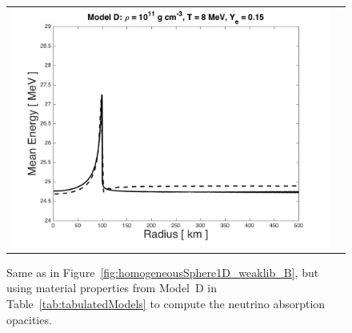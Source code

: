 \documentclass[10pt,preprint]{aastex}
\begin{document}
\begin{figure}
\begin{center}
\begin{tabular}{cc}
      \includegraphics[scale=0.4]{./Figures/HomogeneousSphereTable_D_MeanEnergy}
    \end{tabular}
  \end{center}
  \caption{Same as in Figure~\ref{fig:homogeneousSphere1D_weaklib_B}, but using material properties from Model~D in Table~\ref{tab:tabulatedModels} to compute the neutrino absorption opacities.}
  \label{fig:homogeneousSphere1D_weaklib_D}
\end{figure}

\end{document}
